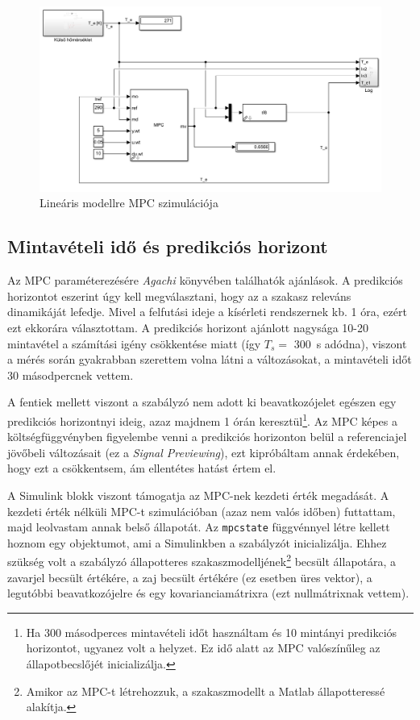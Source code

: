 \begin{figure}[H]
	\centering
	\includegraphics[width=\textwidth]{figures/simscape/simModel}
	\caption{Lineáris modellre MPC szimulációja}
	\label{fig:mpc-sim}
\end{figure}

\subsection{Mintavételi idő és predikciós horizont}

Az MPC paraméterezésére \textit{Agachi \cite{romanMPC_Agachi}} könyvében találhatók ajánlások. A predikciós horizontot eszerint úgy kell megválasztani, hogy az a szakasz releváns dinamikáját lefedje. Mivel a felfutási ideje a kísérleti rendszernek kb. 1 óra, ezért ezt ekkorára választottam. A predikciós horizont ajánlott nagysága 10-20 mintavétel a számítási igény csökkentése miatt (így $T_s =$ \SI{300}{\second} adódna),  viszont a mérés során gyakrabban szerettem volna látni a változásokat, a mintavételi időt 30 másodpercnek vettem.

A fentiek mellett viszont a szabályzó nem adott ki beavatkozójelet egészen egy predikciós horizontnyi ideig, azaz majdnem 1 órán keresztül\footnote{Ha 300 másodperces mintavételi időt használtam és 10 mintányi predikciós horizontot, ugyanez volt a helyzet. Ez idő alatt az MPC valószínűleg az állapotbecslőjét inicializálja.}. Az MPC képes a költségfüggvényben figyelembe venni a predikciós horizonton belül a referenciajel jövőbeli változásait (ez a \textit{Signal Previewing}), ezt kipróbáltam annak érdekében, hogy ezt a  csökkentsem, ám ellentétes hatást értem el.

A Simulink blokk viszont támogatja az MPC-nek kezdeti érték megadását. A kezdeti érték nélküli MPC-t szimulációban (azaz nem valós időben) futtattam, majd leolvastam annak belső állapotát. Az \verb|mpcstate| függvénnyel létre kellett hoznom egy objektumot, ami a Simulinkben a szabályzót inicializálja. Ehhez szükség volt a szabályzó állapotteres szakaszmodelljének\footnote{Amikor az MPC-t létrehozzuk, a szakaszmodellt a Matlab állapotteressé alakítja.} becsült állapotára, a zavarjel becsült értékére, a zaj becsült értékére (ez esetben üres vektor), a legutóbbi beavatkozójelre és egy kovarianciamátrixra (ezt nullmátrixnak vettem).

